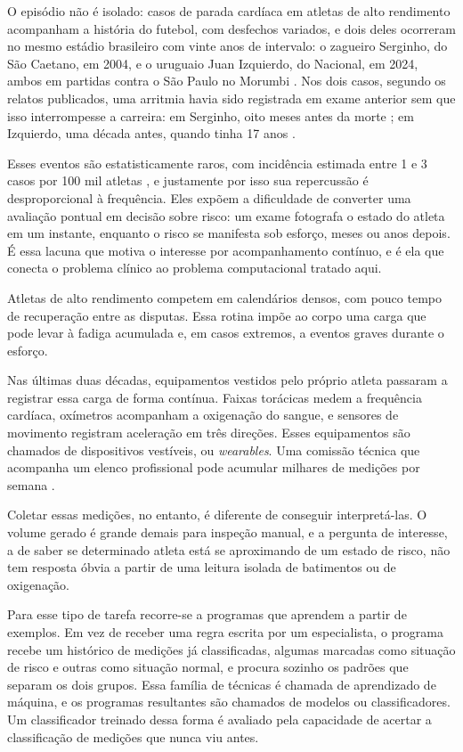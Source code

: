 O episódio não é isolado: casos de parada cardíaca em atletas de alto rendimento acompanham a história do futebol, com desfechos variados, e dois deles ocorreram no mesmo estádio brasileiro com vinte anos de intervalo: o zagueiro Serginho, do São Caetano, em 2004, e o uruguaio Juan Izquierdo, do Nacional, em 2024, ambos em partidas contra o São Paulo no Morumbi \cite{kaizer2024}. Nos dois casos, segundo os relatos publicados, uma arritmia havia sido registrada em exame anterior sem que isso interrompesse a carreira: em Serginho, oito meses antes da morte \cite{kaizer2024}; em Izquierdo, uma década antes, quando tinha 17 anos \cite{espn2024}.

Esses eventos são estatisticamente raros, com incidência estimada entre 1 e 3 casos por 100 mil atletas \cite{mckelvie2024morte}, e justamente por isso sua repercussão é desproporcional à frequência. Eles expõem a dificuldade de converter uma avaliação pontual em decisão sobre risco: um exame fotografa o estado do atleta em um instante, enquanto o risco se manifesta sob esforço, meses ou anos depois. É essa lacuna que motiva o interesse por acompanhamento contínuo, e é ela que conecta o problema clínico ao problema computacional tratado aqui.

Atletas de alto rendimento competem em calendários densos, com pouco tempo de recuperação entre as disputas. Essa rotina impõe ao corpo uma carga que pode levar à fadiga acumulada e, em casos extremos, a eventos graves durante o esforço.

Nas últimas duas décadas, equipamentos vestidos pelo próprio atleta passaram a registrar essa carga de forma contínua. Faixas torácicas medem a frequência cardíaca, oxímetros acompanham a oxigenação do sangue, e sensores de movimento registram aceleração em três direções. Esses equipamentos são chamados de dispositivos vestíveis, ou \textit{wearables}. Uma comissão técnica que acompanha um elenco profissional pode acumular milhares de medições por semana \cite{seshadri2019}.

Coletar essas medições, no entanto, é diferente de conseguir interpretá-las. O volume gerado é grande demais para inspeção manual, e a pergunta de interesse, a de saber se determinado atleta está se aproximando de um estado de risco, não tem resposta óbvia a partir de uma leitura isolada de batimentos ou de oxigenação.

Para esse tipo de tarefa recorre-se a programas que aprendem a partir de exemplos. Em vez de receber uma regra escrita por um especialista, o programa recebe um histórico de medições já classificadas, algumas marcadas como situação de risco e outras como situação normal, e procura sozinho os padrões que separam os dois grupos. Essa família de técnicas é chamada de aprendizado de máquina, e os programas resultantes são chamados de modelos ou classificadores. Um classificador treinado dessa forma é avaliado pela capacidade de acertar a classificação de medições que nunca viu antes.


